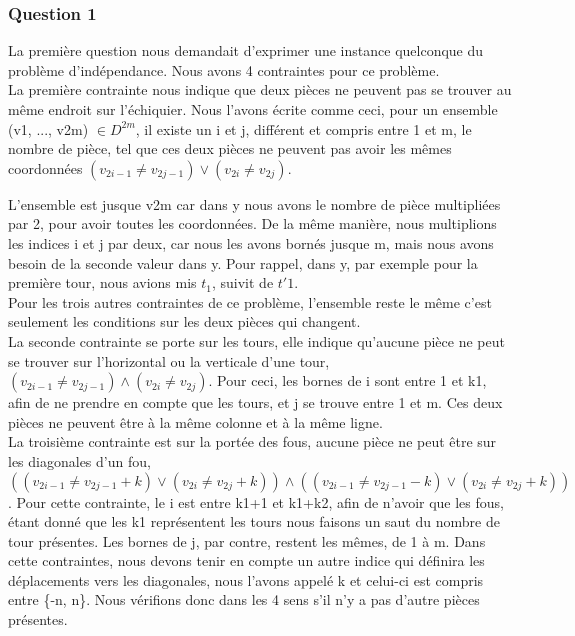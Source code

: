 \documentclass{article}
\begin{document}
\subsubsection{Question 1}
La première question nous demandait d'exprimer une instance quelconque du problème d'indépendance. Nous avons 4 contraintes pour ce problème.\\

La première contrainte nous indique que deux pièces ne peuvent pas se trouver au même endroit sur l'échiquier. 
Nous l'avons écrite comme ceci, pour un ensemble (v1, ..., v2m) $\in D^{2m}$, il existe un i et j, différent et compris entre 1 et m, le nombre de pièce, tel que ces deux pièces ne peuvent pas avoir les mêmes coordonnées $(v_{2i-1} \neq v_{2j-1}) \vee  (v_{2i} \neq v_{2j})$. 

L'ensemble est jusque v2m car dans y nous avons le nombre de pièce multipliées par 2, pour avoir toutes les coordonnées. De la même manière, nous multiplions les indices i et j par deux, car nous les avons bornés jusque m, mais nous avons besoin de la seconde valeur dans y. Pour rappel, dans y, par exemple pour la première tour, nous avions mis $t_{1}$, suivit de $t'{1}$.\\

Pour les trois autres contraintes de ce problème, l'ensemble reste le même c'est seulement les conditions sur les deux pièces qui changent. \\

La seconde contrainte se porte sur les tours, elle indique qu'aucune pièce ne peut se trouver sur l'horizontal ou la verticale d'une tour, $(v_{2i-1} \neq v_{2j-1}) \wedge  (v_{2i} \neq v_{2j})$. Pour ceci, les bornes de i sont entre 1 et k1, afin de ne prendre en compte que les tours, et j se trouve entre 1 et m.  Ces deux pièces ne peuvent être à la même colonne et à la même ligne. \\

La troisième contrainte est sur la portée des fous, aucune pièce ne peut être sur les diagonales d'un fou, $((v_{2i-1} \neq v_{2j-1}+k) \vee  (v_{2i} \neq v_{2j}+k)) \wedge  ((v_{2i-1} \neq v_{2j-1}-k) \vee  (v_{2i} \neq v_{2j}+k))$. Pour cette contrainte, le i est entre k1+1 et k1+k2, afin de n'avoir que les fous, étant donné que les k1 représentent les tours nous faisons un saut du nombre de tour présentes. Les bornes de j, par contre, restent les mêmes, de 1 à m. Dans cette contraintes, nous devons tenir en compte un autre indice qui définira les déplacements vers les diagonales, nous l'avons appelé k et celui-ci est compris entre \{-n, n\}.  Nous vérifions donc dans les 4 sens s'il n'y a pas d'autre pièces présentes.\\
\end{document}
